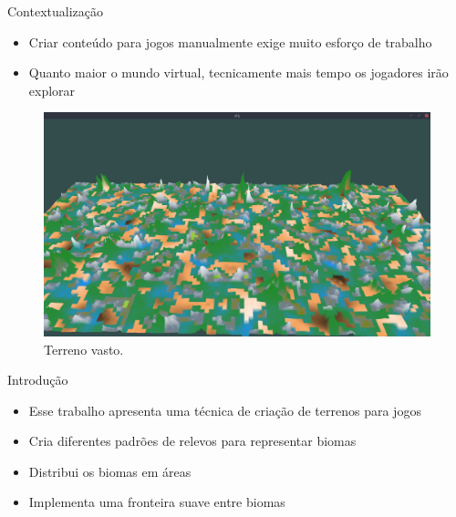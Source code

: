 \begin{frame}{Contextualização}
    \begin{itemize} \setlength\itemsep{1em}
        \item Criar conteúdo para jogos manualmente exige muito esforço de trabalho
        \item Quanto maior o mundo virtual, tecnicamente mais tempo os jogadores irão explorar \cite{fernando2009costas}
    \end{itemize}
    
    \begin{figure}[H]
        \centering
        \includegraphics[width=.5\textwidth]{img/re2bfb/fb/4b32.png}
        \caption{Terreno vasto.}
        \label{fig:img_re2bfb_fb_4b32Again}
    \end{figure}
    
\end{frame}

\begin{frame}{Introdução}
    \begin{itemize} \setlength\itemsep{1em}
        \item Esse trabalho apresenta uma técnica de criação de terrenos para jogos
        \item Cria diferentes padrões de relevos para representar biomas
        \item Distribui os biomas em áreas
        \item Implementa uma fronteira suave entre biomas
    \end{itemize}
    
\end{frame}